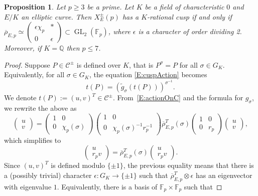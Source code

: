 \documentclass[12pt]{amsart}
\numberwithin{equation}{section}
\newtheorem{proposition}[equation]{Proposition}
\theoremstyle{definition}
\newcommand{\F}{\mathbb{F}}
\newcommand{\Q}{\mathbb{Q}}
\newcommand{\rhobar}{{\overline{\rho}}}
\DeclareMathOperator{\GL}{GL}
\newcommand{\cC}{\mathcal{C}}
\begin{document}
\begin{proposition}\label{prop:cuspsQ}
Let $p \geq 3$ be a prime. Let $K$ be a field of characteristic $0$ and $E/K$ an elliptic curve. 
Then $X_E^\pm(p)$ has a $K$-rational cusp if and only if $\rhobar_{E,p} \simeq
			\left(\begin{smallmatrix}
				\epsilon \chi_p & * \\
				0 & \epsilon
			\end{smallmatrix} \right) \subset \GL_2(\F_p)$, where 
            $\epsilon$ is a character of order dividing 2. Moreover, if $K=\Q$ then $p \leq 7$.
\end{proposition}
\begin{proof}
     Suppose $P \in \cC^\pm$ is defined over $K$, that is $P^\sigma = P$ for all $\sigma \in G_K$. Equivalently, for all $\sigma \in G_K$, the equation \eqref{E:cuspAction} becomes
$$t(P) = (\tilde{g}_\sigma(t(P)))^{\sigma^{-1}}.$$
We denote $t(P) := (u,v)^T \in \cC^\pm$. From~\eqref{E:actionOnC} and the formula for $g_\sigma$, we rewrite the above as 
\[ \begin{pmatrix} u \\ v \end{pmatrix} =
 \left(\begin{matrix}
				1 & 0 \\
				0 & \chi_p(\sigma)
			\end{matrix}\right)
  \left(\begin{matrix}
				1 & 0 \\
				0 & \chi_p(\sigma)^{-1} r_p^{-1}
			\end{matrix}\right) \rhobar_{E,p}^T(\sigma)
			 \left(\begin{matrix}
				1 & 0 \\
				0 &  r_p
			\end{matrix}\right)\begin{pmatrix} u \\ v \end{pmatrix},
\]
which simplifies to
\[
			\begin{pmatrix} u \\ r_p v \end{pmatrix} =
             \rhobar_{E,p}^T(\sigma)
			  \begin{pmatrix} u \\ r_p v \end{pmatrix}.
\]
Since $(u,v)^T$ is defined modulo $\{ \pm 1 \}$, the previous equality means that there is a (possibly trivial) character $\epsilon : G_K \to \{\pm 1\}$ such that $\rhobar_{E,p}^T\otimes \epsilon$ has an eigenvector with eigenvalue $1$. Equivalently, there is a basis of $\F_p \times \F_p$ such that

\end{proof}
\end{document}
